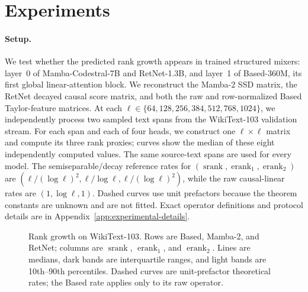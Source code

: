 \documentclass{article}
\newcommand{\srank}{\operatorname{srank}}
\newcommand{\erank}{\operatorname{erank}}
\theoremstyle{definition}
\theoremstyle{remark}
\begin{document}
\section{Experiments}
\label{sec:experiments}

\paragraph{Setup.}
We test whether the predicted rank growth appears in trained structured
mixers: layer~0 of Mamba-Codestral-7B and RetNet-1.3B, and layer~1 of
Based-360M, its first global linear-attention block.  We reconstruct the
Mamba-2 SSD matrix, the RetNet decayed causal score matrix, and both the raw and
row-normalized Based Taylor-feature matrices.  At each
$\ell\in\{64,128,256,384,512,768,1024\}$, we independently process two sampled
text spans from the WikiText-103 validation stream.  For each span and each of
four heads, we construct one $\ell\times\ell$ matrix and compute its three rank
proxies; curves show the median of these eight independently computed values.
The same source-text spans are used for every model.  The
semiseparable/decay reference rates for
$(\srank,\erank_1,\erank_2)$ are
$(\ell/(\log\ell)^2,\ell/\log\ell,\ell/(\log\ell)^2)$, while the raw
causal-linear rates are $(1,\log\ell,1)$.  Dashed curves use unit prefactors
because the theorem constants are unknown and are not fitted.  Exact operator
definitions and protocol details are in
Appendix~\ref{app:experimental-details}.

\begin{figure}[t]
  \centering
  
  \caption{Rank growth on WikiText-103.  Rows are Based, Mamba-2, and RetNet;
  columns are $\srank$, $\erank_1$, and $\erank_2$.  Lines are medians, dark
  bands are interquartile ranges, and light bands are 10th--90th percentiles.
  Dashed curves are unit-prefactor theoretical rates; the Based rate applies
  only to its raw operator.}
  \label{fig:rank-wikitext}
\end{figure}
\end{document}

